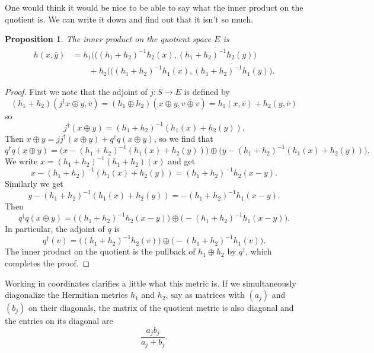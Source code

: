 \documentclass[10pt,a4paper]{article}
\newtheorem{prop}[theo]{Proposition}
\newtheorem*{proof}{Proof}
\def\ov#1{\overline{#1}}
\begin{document}
One would think it would be nice to be able to say what the inner product on the quotient is. We can write it down and find out that it isn't so much.

\begin{prop}
The inner product on the quotient space $E$ is
\begin{align*}
h(x, \ov y)
&=
h_1\bigl(((h_1+h_2)^{-1}h_2(x),
\ov{(h_1+h_2)^{-1}h_2(y)}\bigr)
\\
&\qquad
+ h_2\bigl(((h_1+h_2)^{-1}h_1(x),
\ov{(h_1+h_2)^{-1}h_1(y)}\bigr).
\end{align*}
\end{prop}

\begin{proof}
First we note that the adjoint of $j : S \to E$ is defined by
\[
(h_1 + h_2)(j^\dagger x \oplus y, \ov v)
= (h_1\oplus h_2)( x \oplus y, \ov{v \oplus v})
= h_1(x, \ov v) + h_2(y, \ov v)
\]
so
\[
j^\dagger(x \oplus y)
= (h_1+h_2)^{-1}(h_1(x) + h_2(y)).
\]
Then $x \oplus y = jj^\dagger (x\oplus y) + q^\dagger q(x \oplus y)$, so we find that
\[
q^\dagger q(x \oplus y)
= \bigl(
x - (h_1+h_2)^{-1}(h_1(x) + h_2(y))
\bigr) \oplus
\bigl(
y - (h_1+h_2)^{-1}(h_1(x) + h_2(y))
\bigr).
\]
We write $x = (h_1+h_2)^{-1}(h_1 + h_2)(x)$ and get
\[
x - (h_1+h_2)^{-1}(h_1(x) + h_2(y))
= (h_1+h_2)^{-1}h_2(x - y).
\]
Similarly we get
\[
y - (h_1+h_2)^{-1}(h_1(x) + h_2(y))
= -(h_1+h_2)^{-1}h_1(x - y).
\]
Then
\[
q^\dagger q(x \oplus y)
= \bigl(
(h_1+h_2)^{-1}h_2(x - y)
\bigr)
\oplus
\bigl(
-(h_1+h_2)^{-1}h_1(x - y)
\bigr).
\]
In particular, the adjoint of $q$ is
\[
q^\dagger(v)
=\bigl(
(h_1+h_2)^{-1}h_2(v)
\bigr)
\oplus
\bigl(
-(h_1+h_2)^{-1}h_1(v)
\bigr).
\]
The inner product on the quotient is the pullback of $h_1 \oplus h_2$ by $q^\dagger$, which completes the proof.
\end{proof}

Working in coordinates clarifies a little what this metric is.  If we
simultaneously diagonalize the Hermitian metrics $h_1$ and $h_2$, say as
matrices with $(a_j)$ and $(b_j)$ on their diagonals, the matrix of the quotient
metric is also diagonal and the entries on its diagonal are
\[
\frac{a_jb_j}{a_j+b_j}.
\]
\end{document}
